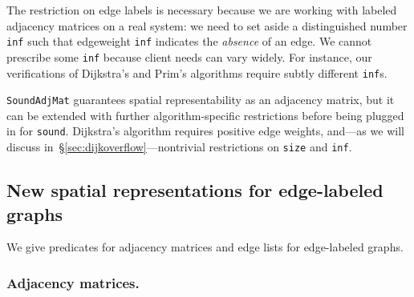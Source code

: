 The restriction on edge labels is necessary because we are working
with labeled adjacency matrices on a real system: we need to set aside
a distinguished number \texttt{inf} such that edgeweight \texttt{inf}
indicates the \emph{absence} of an edge. We cannot
prescribe some \texttt{inf} because client needs can vary widely. For
instance, our verifications of Dijkstra's and Prim's algorithms
require subtly different \texttt{inf}s.

\texttt{SoundAdjMat} guarantees spatial representability
as an adjacency matrix, but it can be extended with further
algorithm-specific restrictions before
being plugged in for \texttt{sound}. Dijkstra's algorithm
requires positive edge weights, and---as we will discuss in~\S\ref{sec:dijkoverflow}---nontrivial restrictions on \texttt{size} and \texttt{inf}.

\subsection{New spatial representations for edge-labeled graphs}
\label{sec:newspatial}

We give predicates for adjacency matrices and edge lists
for edge-labeled graphs.

\subsubsection{Adjacency matrices.}


